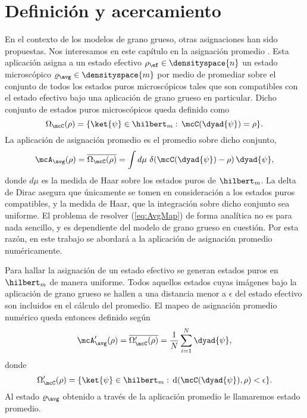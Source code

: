 \section{Definición y acercamiento}

En el contexto de los modelos de grano grueso, otras asignaciones han sido propuestas. Nos interesamos en este capítulo en la asignación promedio \cite{Macro-To-Micro}. Esta aplicación asigna a un estado efectivo $\rho_{\ef} \in \densityspace{n}$ un estado microscópico $\varrho_{\avg} \in \densityspace{m}$ por medio de promediar sobre el conjunto de todos los estados puros microscópicos tales que son compatibles con el estado efectivo bajo una aplicación de grano grueso en particular. Dicho conjunto de estados puros microscópicos queda definido como
\begin{equation}\label{eq:Omega}
    \Omega_{\mcC}(\rho) = \{\ket{\psi}\in\hilbert_{m}:\, \mcC(\dyad{\psi}) = \rho   \}.
\end{equation}
La aplicación de asignación promedio es el promedio sobre dicho conjunto, \ie 
\begin{equation}\label{eq:AvgMap}
    \mcA_{\avg}(\rho) = \overline{\Omega_{\mcC}(\rho)} = \int d \mu\,\, \delta(\mcC(\dyad{\psi})-\rho)\,\dyad{\psi},
\end{equation}
donde $d\mu$ es la medida de Haar sobre los estados puros de $\hilbert_{m}$. La delta de Dirac asegura que únicamente se tomen en consideración a los estados puros compatibles, y la medida de Haar, que la integración sobre dicho conjunto sea uniforme. El problema de resolver (\ref{eq:AvgMap}) de forma analítica no es para nada sencillo, y es dependiente del modelo de grano grueso en cuestión. Por esta razón, en este trabajo se abordará a la aplicación de asignación promedio numéricamente.

Para hallar la asignación de un estado efectivo se generan estados puros en $\hilbert_{m}$ de manera uniforme. Todos aquellos estados cuyas imágenes bajo la aplicación de grano grueso se hallen a una distancia menor a $\epsilon$ del estado efectivo son incluidos en el cálculo del promedio. El mapeo de asignación promedio numérico queda entonces definido según
\begin{equation}\label{eq:AvgMapNum}
    \mcA'_{\avg}(\rho) = \overline{\Omega'_{\mcC}(\rho)} = \frac{1}{N}\sum_{i=1}^{N}\dyad{\psi},
\end{equation}
donde
\begin{equation}\label{eq:OmegaNum}
    \Omega'_{\mcC}(\rho) = \{\ket{\psi}\in\hilbert_{m}:\, \text{d}(\mcC(\dyad{\psi}),\rho)<\epsilon  \}.
\end{equation}
Al estado $\varrho_{\avg}$ obtenido a través de la aplicación promedio le llamaremos estado promedio.

